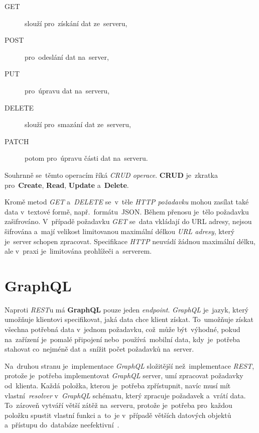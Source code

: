 \documentclass[11pt,a4paper]{report}
\let\oldacrshort\acrshort
\renewcommand{\acrshort}[1]{\emph{\normalsize\color[rgb]{0,0,0}\noindent\oldacrshort{#1}}}
\begin{document}
            \begin{description}
                \item[GET] slouží pro~získání dat ze~serveru,
                \item[POST] pro~odeslání dat na~server,
                \item[PUT] pro~úpravu dat na~serveru,
                \item[DELETE] slouží pro~smazání dat ze~serveru,
                \item[PATCH] potom pro~úpravu části dat na~serveru.
            \end{description}

            Souhrnně se~těmto operacím říká \emph{CRUD operace}. \textbf{CRUD} je~zkratka pro~\textbf{Create}, \textbf{Read}, \textbf{Update} a~\textbf{Delete}.

            Kromě metod \emph{GET} a~\emph{DELETE} se~v~těle \emph{HTTP požadavku} mohou zasílat také data v~textové formě, např.~formátu~JSON. Během přenosu je~tělo požadavku zašifrováno. V~případě požadavku \emph{GET} se~data vkládají do URL adresy, nejsou šifrována a~mají velikost limitovanou maximální délkou \emph{URL adresy}, který je~server schopen zpracovat. Specifikace \acrshort{HTTP} neuvádí žádnou maximální délku, ale v~praxi je~limitována prohlížeči a~serverem. \cite[3.2.1]{ietf-httpbis-messaging-03}

        \section{GraphQL}
            Naproti \acrshort{REST}u má \textbf{GraphQL} pouze jeden \emph{endpoint}. \emph{GraphQL} je~jazyk, který umožňuje klientovi specifikovat, jaká data chce klient získat. To~umožňuje získat všechna potřebná data v~jednom požadavku, což~může být~výhodné, pokud na~zařízení je~pomalé připojení nebo~používá~mobilní data, kdy~je~potřeba stahovat co~nejméně dat a~snížit počet požadavků na~server.

            Na~druhou stranu je~implementace \emph{GraphQL} složitější než~implementace \acrshort{REST}, protože je~potřeba implementovat \emph{GraphQL} server, umí zpracovat požadavky od~klienta. Každá položka, kterou je~potřeba zpřístupnit, navíc musí mít vlastní~\emph{resolver} v~\emph{GraphQL} schématu, který zpracuje požadavek a~vrátí data. To~zároveň vytváří větší zátěž na~serveru, protože je~potřeba pro~každou položku spustit vlastní funkci a~to~je v~případě větších datových objektů a~přístupu do~databáze neefektivní~\cite{Herrera:restgraphql, Dorman:webmappingajax}.
\end{document}
